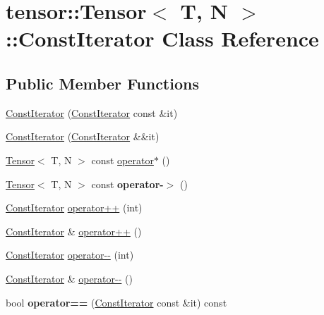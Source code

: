 \hypertarget{classtensor_1_1Tensor_1_1ConstIterator}{}\section{tensor\+:\+:Tensor$<$ T, N $>$\+:\+:Const\+Iterator Class Reference}
\label{classtensor_1_1Tensor_1_1ConstIterator}
\subsection*{Public Member Functions}
\begin{DoxyCompactItemize}
\item 
\hyperlink{classtensor_1_1Tensor_1_1ConstIterator_ae141f00962b2563b1dbc9f0df4d9ae37}{Const\+Iterator} (\hyperlink{classtensor_1_1Tensor_1_1ConstIterator}{Const\+Iterator} const \&it)
\item 
\hyperlink{classtensor_1_1Tensor_1_1ConstIterator_aeb36edd3511181829fcd747640df2c66}{Const\+Iterator} (\hyperlink{classtensor_1_1Tensor_1_1ConstIterator}{Const\+Iterator} \&\&it)
\item 
\hyperlink{classtensor_1_1Tensor}{Tensor}$<$ T, N $>$ const \hyperlink{classtensor_1_1Tensor_1_1ConstIterator_a9d5eb82e51b351d17b4bb72576d8f27e}{operator$\ast$} ()
\item 
\hyperlink{classtensor_1_1Tensor}{Tensor}$<$ T, N $>$ const {\bfseries operator-\/$>$} ()\hypertarget{classtensor_1_1Tensor_1_1ConstIterator_a6a3522d660075384c444cd8fb05d3d53}{}\label{classtensor_1_1Tensor_1_1ConstIterator_a6a3522d660075384c444cd8fb05d3d53}

\item 
\hyperlink{classtensor_1_1Tensor_1_1ConstIterator}{Const\+Iterator} \hyperlink{classtensor_1_1Tensor_1_1ConstIterator_a5308b3a1af5f36a38cb7d683106f9801}{operator++} (int)
\item 
\hyperlink{classtensor_1_1Tensor_1_1ConstIterator}{Const\+Iterator} \& \hyperlink{classtensor_1_1Tensor_1_1ConstIterator_a8b2e804cdc3cd767e75a0c35897e6e8a}{operator++} ()
\item 
\hyperlink{classtensor_1_1Tensor_1_1ConstIterator}{Const\+Iterator} \hyperlink{classtensor_1_1Tensor_1_1ConstIterator_af535e490765f954b8b9e58fbbceb5443}{operator-\/-\/} (int)
\item 
\hyperlink{classtensor_1_1Tensor_1_1ConstIterator}{Const\+Iterator} \& \hyperlink{classtensor_1_1Tensor_1_1ConstIterator_a134db936bb1a10693ea7fd208388d061}{operator-\/-\/} ()
\item 
bool {\bfseries operator==} (\hyperlink{classtensor_1_1Tensor_1_1ConstIterator}{Const\+Iterator} const \&it) const \hypertarget{classtensor_1_1Tensor_1_1ConstIterator_a38debaa1f234db33008b050c2c072fb3}{}\label{classtensor_1_1Tensor_1_1ConstIterator_a38debaa1f234db33008b050c2c072fb3}


\end{DoxyCompactItemize}
